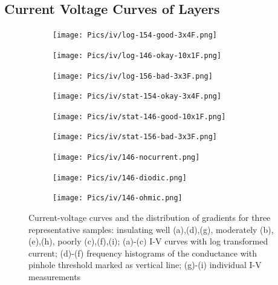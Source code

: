 \subsection{Current Voltage Curves of  Layers} 
\begin{figure}
    \centering
    \begin{subfigure}{.32\textwidth}
        \texttt{[image: Pics/iv/log-154-good-3x4F.png]}
		\caption{}%
		\label{fig:iv-log-good}
    \end{subfigure}
    \begin{subfigure}{.32\textwidth}
        \texttt{[image: Pics/iv/log-146-okay-10x1F.png]}
		\caption{}%
		\label{fig:iv-log-okay}
    \end{subfigure}
    \begin{subfigure}{.32\textwidth}
        \texttt{[image: Pics/iv/log-156-bad-3x3F.png]}
		\caption{}%
		\label{fig:iv-log-bad}
    \end{subfigure}
    \begin{subfigure}{.32\textwidth}
        \texttt{[image: Pics/iv/stat-154-okay-3x4F.png]}
		\caption{}%
		\label{fig:iv-stat-good}
    \end{subfigure}
    \begin{subfigure}{.32\textwidth}
        \texttt{[image: Pics/iv/stat-146-good-10x1F.png]}
		\caption{}%
		\label{fig:iv-stat-okay}
    \end{subfigure}
    \begin{subfigure}{.32\textwidth}
        \texttt{[image: Pics/iv/stat-156-bad-3x3F.png]}
		\caption{}%
		\label{fig:iv-stat-bad}
    \end{subfigure}
    \begin{subfigure}{.32\textwidth}
        \texttt{[image: Pics/iv/146-nocurrent.png]}
		\caption{}%
		\label{fig:iv-nocurrent}
    \end{subfigure}
    \begin{subfigure}{.32\textwidth}
        \texttt{[image: Pics/iv/146-diodic.png]}
		\caption{}%
		\label{fig:iv-diodic}
    \end{subfigure}
    \begin{subfigure}{.32\textwidth}
        \texttt{[image: Pics/iv/146-ohmic.png]}
		\caption{}%
		\label{fig:iv-ohmic}
    \end{subfigure}
	\caption{
		Current-voltage curves and the distribution of gradients for three representative samples: insulating well (a),(d),(g), moderately (b),(e),(h), poorly (c),(f),(i); 
		(a)-(c) I-V curves with log transformed current; 
		(d)-(f) frequency histograms of the conductance with pinhole threshold marked as vertical line; 
		(g)-(i) individual I-V measurements
	}
    \label{fig:iv}
\end{figure}

